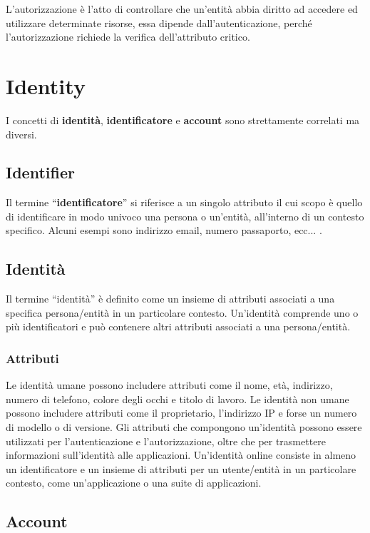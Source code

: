 L'autorizzazione è l'atto di controllare che un'entità abbia diritto ad
accedere ed utilizzare determinate risorse, essa
dipende dall'autenticazione, perché l'autorizzazione richiede
la verifica dell'attributo critico.

\section{Identity}

I concetti di \textbf{identità}, \textbf{identificatore} e \textbf{account} sono
strettamente correlati ma diversi.

\subsection{Identifier}

Il termine ``\textbf{identificatore}'' si riferisce a un singolo attributo il cui scopo
è quello di identificare in modo univoco una persona o un'entità,
all'interno di un contesto specifico. Alcuni esempi sono
indirizzo email, numero passaporto, ecc... .

\subsection{Identità}

Il termine ``identità'' è definito come un insieme di attributi associati a una
specifica persona/entità in un particolare contesto. Un'identità comprende uno o
più identificatori e può contenere altri attributi associati a una persona/entità.

\subsubsection{Attributi}

Le identità umane possono includere attributi come il nome, età, indirizzo,
numero di telefono, colore degli occhi e titolo di lavoro.
Le identità non umane possono includere attributi come il proprietario,
l'indirizzo IP e forse un numero di modello o di versione.
Gli attributi che compongono un'identità possono essere utilizzati per
l'autenticazione e l'autorizzazione, oltre che per trasmettere informazioni
sull'identità alle applicazioni.
Un'identità online consiste in almeno un identificatore e un insieme di attributi
per un utente/entità in un particolare contesto, come un'applicazione o una suite di
applicazioni.

\subsection{Account}

